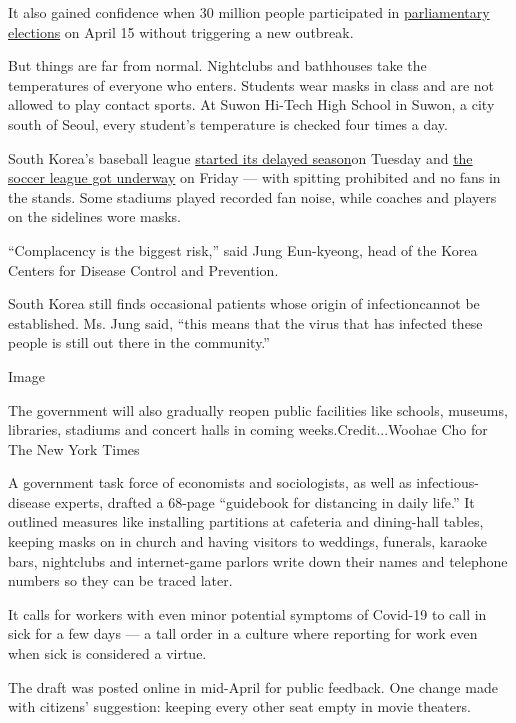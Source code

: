 It also gained confidence when 30 million people participated in
\href{https://www.nytimes3xbfgragh.onion/2020/04/15/world/asia/south-korea-election.html}{parliamentary
elections} on April 15 without triggering a​ new outbreak.

But things are far from normal. Nightclubs and bathhouses take the
temperatures of everyone who enters. Students wear masks in class and
are not allowed to play contact sports. At Suwon Hi-Tech High School in
Suwon, a city south of Seoul, every student's temperature is checked
four times a day.

South Korea's baseball league
\href{https://www.nytimes3xbfgragh.onion/2020/05/07/sports/coronavirus-korea-baseball-opening.html}{started
its delayed season}on Tuesday and
\href{https://www.nytimes3xbfgragh.onion/2020/05/08/sports/soccer-south-korea.html}{the
soccer league got underway} on Friday --- with spitting prohibited and
no fans in the stands. Some stadiums played recorded fan noise, while
coaches and players on the sidelines wore masks.

``Complacency is the biggest risk,'' said Jung Eun-kyeong, head of the
Korea Centers for Disease Control and Prevention.

​South Korea still finds occasional patients whose origin of infection
​cannot be established. Ms. Jung said, ``this means that the virus that
has infected these people is still out there in the community.''

Image

The government will also gradually reopen public facilities like
schools, museums, libraries, stadiums and concert halls in coming
weeks.Credit...Woohae Cho for The New York Times

A government task force of ​economists and sociologists, as well as
infectious-disease experts, drafted a 68-page ``guidebook for distancing
in daily life.'' It outlined measures like installing partitions at
cafeteria and dining-hall tables, keeping masks on in church and having
visitors to weddings, funerals, karaoke bars, nightclubs and
internet-game parlors write down their names and telephone numbers so
they can be traced later.

It calls for workers with even minor potential symptoms of Covid-19 to
call in sick for a few days --- a tall order in a culture where
reporting for work even when sick is considered a virtue.

The draft was posted online in mid-April ​for public feedback. One
change made with citizens' suggestion: keeping every other seat empty in
movie theaters.​


